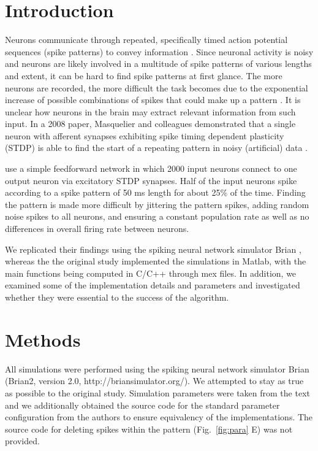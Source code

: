 \documentclass[10pt,a4paper,onecolumn]{article}
\begin{document}
\section{Introduction}\label{introduction}

Neurons communicate through repeated, specifically timed action
potential sequences (spike patterns) to convey information
\autocites{Fellous2004}{Prut1998}. Since neuronal activity is noisy and
neurons are likely involved in a multitude of spike patterns of various
lengths and extent, it can be hard to find spike patterns at first
glance. The more neurons are recorded, the more difficult the task
becomes due to the exponential increase of possible combinations of
spikes that could make up a pattern \autocite{Buonomano2009}. It is
unclear how neurons in the brain may extract relevant information from
such input. In a 2008 paper, Masquelier and colleagues demonstrated that
a single neuron with afferent synapses exhibiting spike timing dependent
plasticity (STDP) is able to find the start of a repeating pattern in
noisy (artificial) data \autocite{Masq2008}.

\textcite{Masq2008} use a simple feedforward network in which 2000 input
neurons connect to one output neuron via excitatory STDP synapses. Half
of the input neurons spike according to a spike pattern of 50 ms length
for about 25\% of the time. Finding the pattern is made more difficult
by jittering the pattern spikes, adding random noise spikes to all
neurons, and ensuring a constant population rate as well as no
differences in overall firing rate between neurons.

We replicated their findings using the spiking neural network simulator
Brian \autocites{Goodman2009}{Stimberg2014}, whereas the the original
study implemented the simulations in Matlab, with the main functions
being computed in C/C++ through mex files. In addition, we examined some
of the implementation details and parameters and investigated whether
they were essential to the success of the algorithm.

\section{Methods}\label{methods}

All simulations were performed using the spiking neural network
simulator Brian (Brian2, version 2.0, http://briansimulator.org/). We
attempted to stay as true as possible to the original study. Simulation
parameters were taken from the text and we additionally obtained the
source code for the standard parameter configuration from the authors to
ensure equivalency of the implementations. The source code for deleting
spikes within the pattern (Fig.~\ref{fig:para} E) was not provided.
\end{document}
